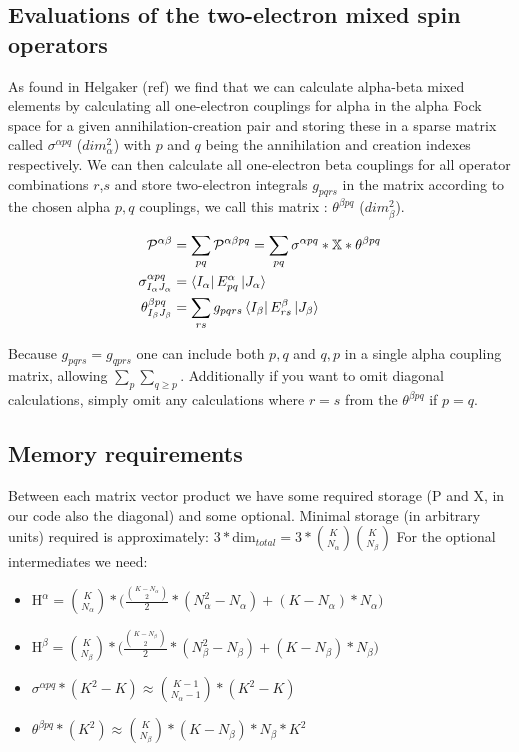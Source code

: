 \documentclass[12p]{article}
\begin{document}
\subsection{Evaluations of the two-electron mixed spin operators}

As found in Helgaker (ref) we find that we can calculate alpha-beta mixed elements by calculating all one-electron couplings for alpha in the alpha Fock space for a given annihilation-creation pair and storing these in a sparse matrix called $\sigma^{\alpha pq}$ ($dim^{2}_{\alpha}$) with $p$ and $q$ being the annihilation and creation indexes respectively.
We can then calculate all one-electron beta couplings for all operator combinations $r$,$s$ and store two-electron integrals $g_{pqrs}$ in the matrix according to the chosen alpha $p,q$ couplings, we call this matrix : $\theta^{\beta pq}$ ($dim^{2}_{\beta}$).

\begin{align}
\mathcal{P}^{\alpha \beta} & = \sum_{pq}  \mathcal{P}^{\alpha \beta pq} = \sum_{pq} \sigma^{\alpha pq} * \mathbb{X} * \theta^{\beta pq} \\
\sigma^{\alpha pq}_{I_\alpha J_\alpha} & =\bra{I_\alpha} E^{\alpha}_{pq} \ket{J_\alpha} \\
\theta^{\beta pq}_{I_\beta J_\beta} &  = \sum_{rs} g_{pqrs} \bra{I_\beta} E^{\beta}_{rs} \ket{J_\beta}
\end{align}

Because $g_{pqrs} = g_{qprs}$ one can include both $p,q$ and $q,p$ in a single alpha coupling matrix, allowing $\sum_p \sum_{q \geq p}$. Additionally if you want to omit diagonal calculations, simply omit any calculations where $r=s$ from the $\theta^{\beta pq}$ if $p=q$.

\subsection{Memory requirements}

Between each matrix vector product we have some required storage (P and X, in our code also the diagonal) and some optional.
Minimal storage (in arbitrary units) required is approximately: $3 * \text{dim}_{total} = 3 * \binom{K}{N_\alpha}\binom{K}{N_\beta}$
For the optional intermediates we need:
\begin{itemize}
  \item $\text{H}^{\alpha} = \binom{K}{N_\alpha} * \big(\frac{\binom{K-N_\alpha}{2}}{2} * (N_{\alpha}^2-N_\alpha) + (K-N_\alpha)*N_\alpha \big)$

    \item $\text{H}^{\beta} = \binom{K}{N_\beta} * \big(\frac{\binom{K-N_\beta}{2}}{2} * (N_{\beta}^2-N_\beta) + (K-N_\beta)*N_\beta \big)$
  \item  $\sigma^{\alpha pq} * (K^2 - K) \approx \binom{K-1}{N_\alpha-1} * (K^2 - K) $
  \item $\theta^{\beta pq} * (K^2) \approx \binom{K}{N_\beta} * (K-N_\beta)*N_\beta * K^2$
\end{itemize}
\end{document}
